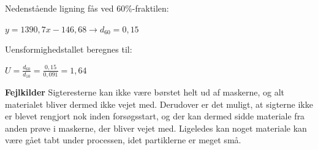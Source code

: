 Nedenstående ligning fås ved 60\%-fraktilen:
\begin{center}
	$y = 1390,\!7x - 146,\!68 \rightarrow d_{60}=0,\!15$
\end{center}

Uensformighedstallet beregnes til:
\begin{center}
	$U=\frac{d_{60}}{d_{10}} = \frac{0,\!15}{0,\!091} = 1,\!64$
\end{center}

\textbf{Fejlkilder}
\newline
Sigteresterne kan ikke være børstet helt ud af maskerne, og alt materialet bliver dermed ikke vejet med. Derudover er det muligt, at sigterne ikke er blevet rengjort nok inden forsøgsstart, og der kan dermed sidde materiale fra anden prøve i maskerne, der bliver vejet med.
\newline \indent{     }  Ligeledes kan noget materiale kan være gået tabt under processen, idet partiklerne er meget små. 